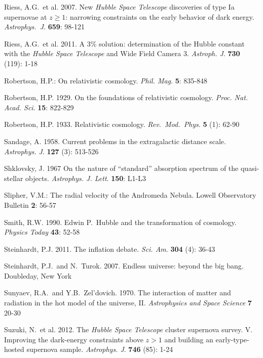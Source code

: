 \documentclass[12 pt]{article}
\begin{document}
\begin{thebibliography}{}
 Riess, A.G.\ et al. 2007. New \textit{Hubble Space Telescope} discoveries of type Ia supernovae at $z \geq 1$: narrowing constraints on the early behavior of dark energy. \textit{Astrophys.\ J}. \textbf{659}: 98-121

 Riess, A.G.\ et al. 2011. A 3\% solution: determination of the Hubble constant with the \textit{Hubble Space Telescope} and Wide Field Camera 3. \textit{Astroph. J}. \textbf{730} (119): 1-18

 Robertson, H.P.: On relativistic cosmology. \textit{Phil. Mag}. \textbf{5}: 835-848

 Robertson, H.P. 1929. On the foundations of relativistic cosmology. \textit{Proc. Nat. Acad. Sci}. \textbf{15}: 822-829

 Robertson, H.P. 1933. Relativistic cosmology. \textit{Rev.\ Mod.\ Phys}. \textbf{5} (1): 62-90

 Sandage, A. 1958. Current problems in the extragalactic distance scale. \textit{Astrophys. J}. \textbf{127} (3): 513-526

 Shklovsky, J. 1967 On the nature of ``standard'' absorption spectrum of the quasi-stellar objects. \textit{Astrophys. J. Lett}. \textbf{150}: L1-L3

 Slipher, V.M.: The radial velocity of the Andromeda Nebula. Lowell Observatory Bulletin \textbf{2}: 56-57

 Smith, R.W. 1990. Edwin P.\ Hubble and the transformation of cosmology. \textit{Physics Today} \textbf{43}: 52-58

 Steinhardt, P.J. 2011. The inflation debate. \textit{Sci. Am}. \textbf{304} (4): 36-43

 Steinhardt, P.J.\ and N.\ Turok. 2007. Endless universe: beyond the big bang. Doubleday, New York

 Sunyaev, R.A.\ and Y.B.\ Zel'dovich. 1970. The interaction of matter and radiation in the hot model of the universe, II. \textit{Astrophysics and Space Science} \textbf{7} 20-30

 Suzuki, N.\ et al. 2012. The \textit{Hubble Space Telescope} cluster supernova survey. V. Improving the dark-energy constraints above $z > 1$ and building an early-type-hosted supernova sample. \textit{Astrophys. J}. \textbf{746} (85): 1-24


\end{thebibliography}
\end{document}
